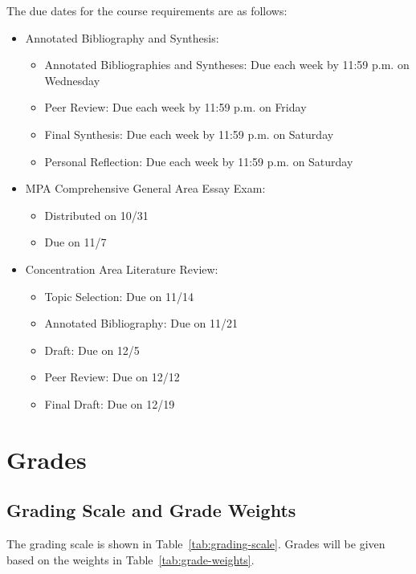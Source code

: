 \documentclass[12pt, letterpaper]{article}
\begin{document}
The due dates for the course requirements are as follows:
    \begin{itemize}
        \item Annotated Bibliography and Synthesis: 
        \begin{itemize}
            \item Annotated Bibliographies and Syntheses: Due each week by 11:59 p.m. on Wednesday
            \item Peer Review: Due each week by 11:59 p.m. on Friday
            \item Final Synthesis: Due each week by 11:59 p.m. on Saturday
            \item Personal Reflection: Due each week by 11:59 p.m. on Saturday
        \end{itemize}
        \item MPA Comprehensive General Area Essay Exam:
        \begin{itemize}
            \item Distributed on 10/31
            \item Due on 11/7
        \end{itemize}
        \item Concentration Area Literature Review:
        \begin{itemize}
            \item Topic Selection: Due on 11/14
            \item Annotated Bibliography: Due on 11/21
            \item Draft: Due on 12/5
            \item Peer Review: Due on 12/12
            \item Final Draft: Due on 12/19
        \end{itemize}
    \end{itemize}

\section{Grades}


\subsection*{Grading Scale and Grade Weights}  

The grading scale is shown in Table~\ref{tab:grading-scale}. Grades will be given based on the weights in Table~\ref{tab:grade-weights}.
\end{document}
